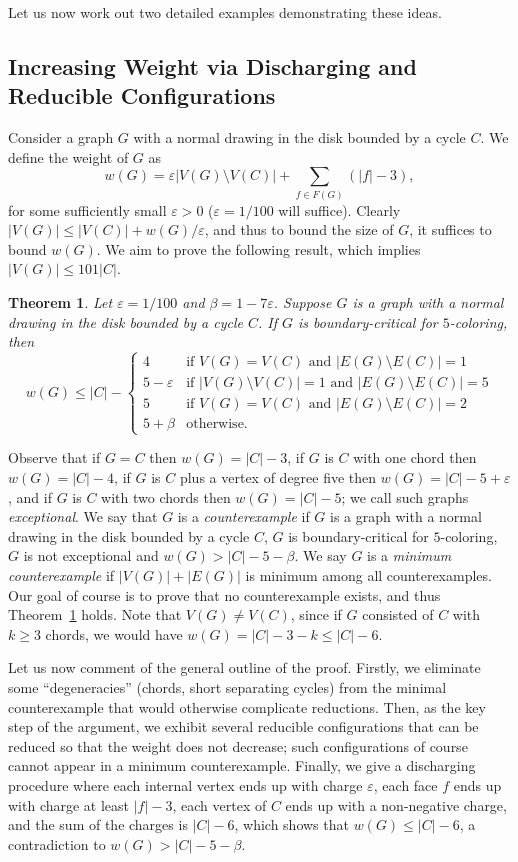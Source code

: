 \documentclass[12pt,twoside,openright,a4paper]{book}
\newtheorem{theorem}{Theorem}[chapter]
\begin{document}
Let us now work out two detailed examples demonstrating these ideas.

\subsection{Increasing Weight via Discharging and Reducible Configurations}

Consider a graph $G$ with a normal drawing in the disk bounded by a cycle $C$.  We define
the weight of $G$ as
$$w(G)=\varepsilon|V(G)\setminus V(C)|+\sum_{f\in F(G)} (|f|-3),$$
for some sufficiently small $\varepsilon>0$ ($\varepsilon=1/100$ will suffice).
Clearly $|V(G)|\le |V(C)|+w(G)/\varepsilon$, and thus to bound the size of $G$,
it suffices to bound $w(G)$.  We aim to prove the following result, which implies $|V(G)|\le 101|C|$.

\begin{theorem}\label{thm:wt5}
Let $\varepsilon=1/100$ and $\beta=1-7\varepsilon$.  Suppose $G$ is a graph with a normal drawing in the disk bounded by a cycle $C$.
If $G$ is boundary-critical for $5$-coloring, then
$$w(G)\le |C|-\begin{cases}
4&\text{if $V(G)=V(C)$ and $|E(G)\setminus E(C)|=1$}\\
5-\varepsilon&\text{if $|V(G)\setminus V(C)|=1$ and $|E(G)\setminus E(C)|=5$}\\
5&\text{if $V(G)=V(C)$ and $|E(G)\setminus E(C)|=2$}\\
5+\beta&\text{otherwise.}
\end{cases}$$
\end{theorem}
Observe that if $G=C$ then $w(G)=|C|-3$, if $G$ is $C$ with one chord then $w(G)=|C|-4$, if $G$ is $C$ plus a vertex of degree five
then $w(G)=|C|-5+\varepsilon$, and if $G$ is $C$ with two chords then $w(G)=|C|-5$; we call such graphs \emph{exceptional}.
We say that $G$ is a \emph{counterexample} if $G$ is a graph with a normal drawing in the disk bounded by a cycle $C$,
$G$ is boundary-critical for $5$-coloring, $G$ is not exceptional
and $w(G)>|C|-5-\beta$.  We say $G$ is a \emph{minimum counterexample} if $|V(G)|+|E(G)|$ is minimum among all counterexamples.
Our goal of course is to prove that no counterexample exists, and thus Theorem~\ref{thm:wt5} holds.
Note that $V(G)\neq V(C)$, since if $G$ consisted of $C$ with $k\ge 3$ chords, we would have $w(G)=|C|-3-k\le |C|-6$.

Let us now comment of the general outline of the proof.  Firstly, we eliminate some ``degeneracies'' (chords, short separating
cycles) from the minimal counterexample that would otherwise complicate reductions.  Then, as the key step of the argument,
we exhibit several reducible configurations that can be reduced so that the weight does not decrease; such configurations
of course cannot appear in a minimum counterexample.  Finally, we give a discharging procedure where each internal vertex ends up
with charge $\varepsilon$, each face $f$ ends up with charge at least $|f|-3$, each vertex of $C$ ends up with a non-negative charge,
and the sum of the charges is $|C|-6$, which shows that $w(G)\le |C|-6$,
a contradiction to $w(G)>|C|-5-\beta$.
\end{document}
